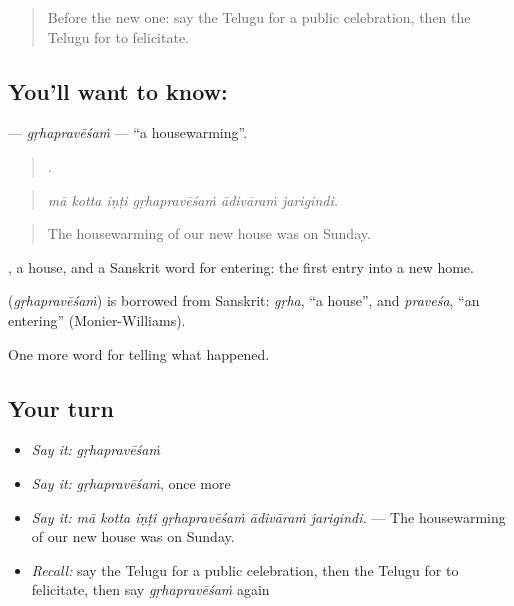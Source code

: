\label{lesson:TE-C356-grhapravesam}



\begin{quote}
Before the new one: say the Telugu for a public celebration, then the Telugu for to felicitate.
\end{quote}

\subsection*{You'll want to know: }
\textbf{} — \emph{gṛhapravēśaṁ} — \textquotedblleft{}a housewarming\textquotedblright{}.

\begin{quote}
     .
\end{quote}

\begin{quote}
\emph{mā kotta iṇṭi gṛhapravēśaṁ ādivāraṁ jarigindi.}
\end{quote}

\begin{quote}
The housewarming of our new house was on Sunday.
\end{quote}

, a house, and a Sanskrit word for entering: the first entry into a new home.

\begin{cousinweb}
\textbf{} (\emph{gṛhapravēśaṁ}) is borrowed from Sanskrit: \emph{gṛha}, \textquotedblleft{}a house\textquotedblright{}, and \emph{praveśa}, \textquotedblleft{}an entering\textquotedblright{} (Monier-Williams).
\end{cousinweb}

\begin{grammarlens}[title={What you've built}]
One more word for telling what happened.
\end{grammarlens}

\subsection*{Your turn}
\begin{itemize}
\raggedright
  \item \emph{Say it:} \emph{gṛhapravēśaṁ}
  \item \emph{Say it:} \emph{gṛhapravēśaṁ}, once more
  \item \emph{Say it:} \emph{mā kotta iṇṭi gṛhapravēśaṁ ādivāraṁ jarigindi.} — The housewarming of our new house was on Sunday.
  \item \emph{Recall:} say the Telugu for a public celebration, then the Telugu for to felicitate, then say \emph{gṛhapravēśaṁ} again
\end{itemize}

